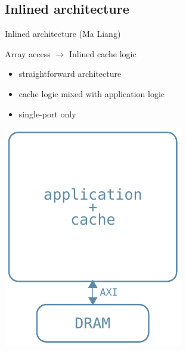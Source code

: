 \documentclass[handout]{beamer}
\begin{document}
\subsection{Inlined architecture}
\begin{frame}{Inlined architecture (Ma Liang)}
	\begin{minipage}{.7\textwidth}
		\begin{center}
			Array access $\rightarrow$ Inlined cache logic
		\end{center}

		\bigskip

		\begin{itemize}
			\item straightforward architecture
			\item cache logic mixed with application logic
			\item single-port only
		\end{itemize}
	\end{minipage}
	\begin{minipage}{.28\textwidth}
		\begin{center}
			\includegraphics[width=.9\textwidth]{liang_arch.pdf}
		\end{center}
	\end{minipage}
\end{frame}
\end{document}
